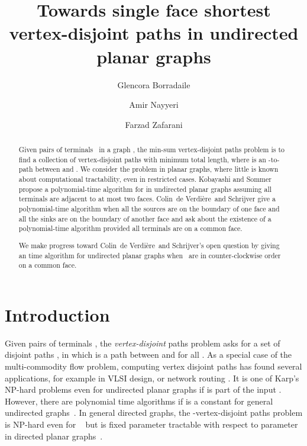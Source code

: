 \documentclass[11pt,twoside]{article}
\title{Towards single face shortest vertex-disjoint paths in undirected planar graphs}
\author{Glencora Borradaile}
\author{Amir Nayyeri}
\author{Farzad Zafarani}
\affil{School of Electrical Engineering and Computer Science \\ Oregon State University\\
	\{glencora, nayyeria, zafaranf\}@eecs.oregonstate.edu}
\newcommand{\EMPH}[1]{\emph{#1}}
\newcommand{\terminals}{}
\newcommand{\opts}{}
\newcommand{\eric}{Colin~de Verdi{\`e}re}
\begin{document}
\maketitle

\begin{abstract}
Given  pairs of terminals \terminals\ in a graph , the min-sum  vertex-disjoint paths problem is to find a collection  of vertex-disjoint paths with minimum total length, where  is an -to- path between  and .  We consider the problem in planar graphs, where little is known about computational tractability, even in restricted cases. Kobayashi and Sommer propose a polynomial-time algorithm for  in undirected planar graphs assuming all terminals are adjacent to at most two faces.
\eric\ and Schrijver give a polynomial-time algorithm when all the sources are on the boundary of one face and all the sinks are on the boundary of another face and ask about the existence of a polynomial-time algorithm provided all terminals are on a common face.  

We make progress toward \eric\ and Schrijver's open question by giving an  time algorithm for undirected planar graphs when \terminals\ are in counter-clockwise order on a common face.
\end{abstract}

\newpage
\section{Introduction}

Given  pairs of terminals \terminals, the \EMPH{ vertex-disjoint} paths problem asks for a set of  disjoint paths \opts, in which  is a path between  and  for all .
As a special case of the multi-commodity flow problem, computing vertex disjoint paths has found several applications, for example in VLSI design\cite{kramer1984complexity}, or network routing \cite{ogier1993distributed,srinivas2005finding}.  
It is one of Karp's NP-hard problems \cite{karp1974} even for undirected planar graphs if  is part of the input \cite{middendorf1993disjPathComplexity}.  
However, there are polynomial time algorithms if  is a constant for general undirected graphs~\cite{robertson1995graph, Kawarabayashi2010shorterProofGraphMinorAlg}.
In general directed graphs, the -vertex-disjoint paths problem is NP-hard even for ~\cite{fortune1980directedSubGraphHom} but is fixed parameter tractable with respect to parameter  in directed planar graphs~\cite{schrijver1994finding, cygan2013planarDirDisjFPT}.
\end{document}
